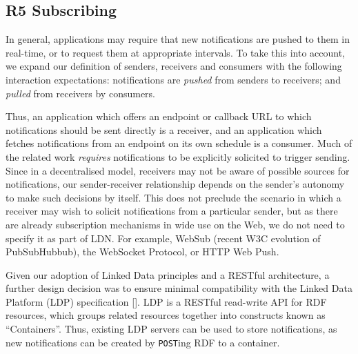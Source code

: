 \documentclass[a4paper]{llncs}
\begin{document}
                            
                                \subsection{R5 Subscribing}
  \label{subscribing}

                                
                                    
\par In general, applications may require that new notifications are pushed to them in real-time, or to request them at appropriate intervals. To take this into account, we expand our definition of senders, receivers and consumers with the following interaction expectations: notifications are {\em pushed} from senders to receivers; and {\em pulled} from receivers by consumers.

                                    
\par Thus, an application which offers an endpoint or callback URL to which notifications should be sent directly is a receiver, and an application which fetches notifications from an endpoint on its own schedule is a consumer. Much of the related work {\em requires} notifications to be explicitly solicited to trigger sending. Since in a decentralised model, receivers may not be aware of possible sources for notifications, our sender-receiver relationship depends on the sender’s autonomy to make such decisions by itself. This does not preclude the scenario in which a receiver may wish to solicit notifications from a particular sender, but as there are already subscription mechanisms in wide use on the Web, we do not need to specify it as part of LDN. For example, \empty WebSub (recent W3C evolution of PubSubHubbub), the WebSocket Protocol, or HTTP Web Push.
                                
                            

                            
\par Given our adoption of Linked Data principles and a RESTful architecture, a further design decision was to ensure minimal compatibility with the \empty Linked Data Platform (LDP) specification []. LDP is a RESTful read-write API for RDF resources, which groups related resources together into constructs known as ``Containers''. Thus, existing LDP servers can be used to store notifications, as new notifications can be created by {\tt POST}ing RDF to a container.
                        
                    
\end{document}

